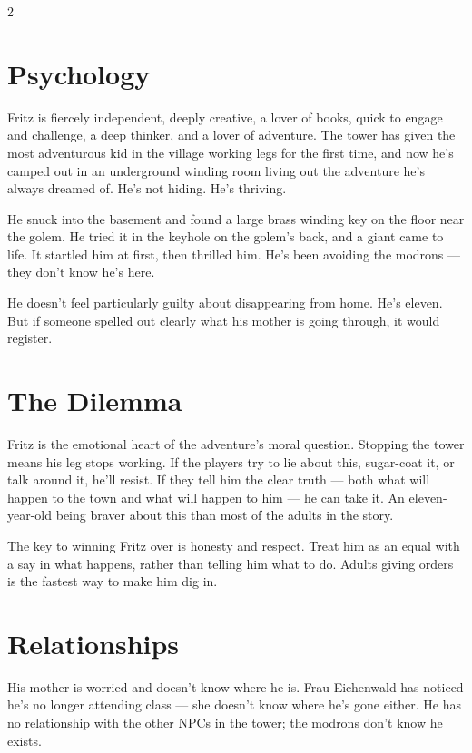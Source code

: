 \documentclass[10pt,letterpaper]{article}
\begin{document}
\begin{multicols}{2}
\section*{Psychology}
Fritz is fiercely independent, deeply creative, a lover of books, quick to engage and challenge, a deep thinker, and a lover of adventure. The tower has given the most adventurous kid in the village working legs for the first time, and now he's camped out in an underground winding room living out the adventure he's always dreamed of. He's not hiding. He's thriving.

He snuck into the basement and found a large brass winding key on the floor near the golem. He tried it in the keyhole on the golem's back, and a giant came to life. It startled him at first, then thrilled him. He's been avoiding the modrons --- they don't know he's here.

He doesn't feel particularly guilty about disappearing from home. He's eleven. But if someone spelled out clearly what his mother is going through, it would register.

\section*{The Dilemma}
Fritz is the emotional heart of the adventure's moral question. Stopping the tower means his leg stops working. If the players try to lie about this, sugar-coat it, or talk around it, he'll resist. If they tell him the clear truth --- both what will happen to the town and what will happen to him --- he can take it. An eleven-year-old being braver about this than most of the adults in the story.

The key to winning Fritz over is honesty and respect. Treat him as an equal with a say in what happens, rather than telling him what to do. Adults giving orders is the fastest way to make him dig in.

\section*{Relationships}
His mother is worried and doesn't know where he is. Frau Eichenwald has noticed he's no longer attending class --- she doesn't know where he's gone either. He has no relationship with the other NPCs in the tower; the modrons don't know he exists.


\end{multicols}
\end{document}
